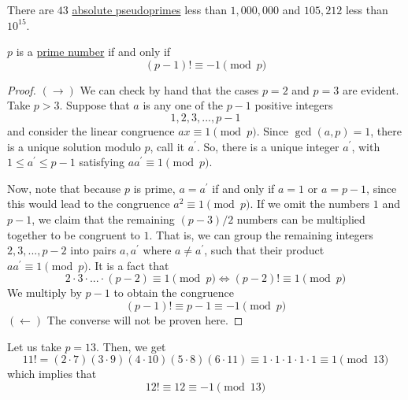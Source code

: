 \documentclass{article}
\newcounter{theorem}[section]
\newcounter{example}[section]
\begin{document}
There are $43$ \hyperref[def:absolute-pseudoprime]{absolute pseudoprimes} less than $1,000,000$ and $105,212$ less than $10^{15}$. 

\begin{theorem}
  \label{thm:wilsons-theorem}
$p$ is a \hyperref[def:prime-number]{prime number} if and only if 
\begin{equation}
  (p-1)! \equiv -1 \pmod{p}
\end{equation}
\end{theorem}
\begin{proof}
$(\rightarrow)$ We can check by hand that the cases $p=2$ and $p=3$ are evident. Take $p >3$. Suppose that $a$ is any one of the $p-1$ positive integers
\begin{equation}
  1, 2, 3, ..., p-1
\end{equation}
and consider the linear congruence $ax \equiv 1 \pmod{p}$. Since $\gcd(a, p) = 1$, there is a unique solution modulo $p$, call it $a^\prime$. So, there is a unique integer $a^\prime$, with $1 \leq a^\prime \leq p-1$ satisfying $a a^\prime \equiv 1 \pmod{p}$. 

Now, note that because $p$ is prime, $a = a^\prime$ if and only if $a = 1$ or $a = p-1$, since this would lead to the congruence $a^2 \equiv 1 \pmod{p}$. If we omit the numbers $1$ and $p-1$, we claim that the remaining $(p-3)/2$ numbers can be multiplied together to be congruent to $1$. That is, we can group the remaining integers $2, 3, ..., p-2$ into pairs $a, a^\prime$ where $a \neq a^\prime$, such that their product $a a^\prime \equiv 1 \pmod{p}$. It is a fact that 
\begin{equation}
  2 \cdot 3 \cdot ... \cdot (p-2) \equiv 1 \pmod{p} \iff (p-2)! \equiv 1 \pmod{p}
\end{equation}
We multiply by $p-1$ to obtain the congruence
\begin{equation}
  (p-1)! \equiv p-1 \equiv -1 \pmod{p}
\end{equation}
$(\leftarrow)$ The converse will not be proven here. 
\end{proof}

\begin{example}[Wilson's Theorem for $p = 13$]
  \label{ex:wilsons-theorem-for-p13}
Let us take $p=13$. Then, we get 
\begin{equation}
  11! = (2 \cdot 7) (3 \cdot 9) (4 \cdot 10) (5 \cdot 8) (6 \cdot 11) \equiv 1 \cdot 1 \cdot 1 \cdot 1 \cdot 1 \equiv 1 \pmod{13}
\end{equation}
which implies that 
\begin{equation}
  12! \equiv 12 \equiv -1 \pmod{13}
\end{equation}
\end{example}
\end{document}
